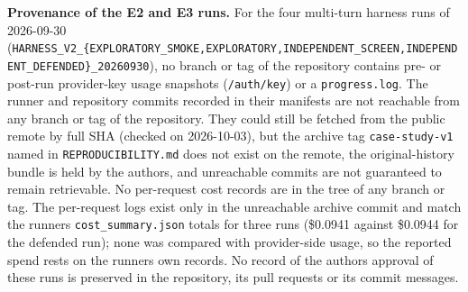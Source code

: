 \documentclass[9pt]{extarticle}
\begin{document}
\textbf{Provenance of the E2 and E3 runs.} For the four multi-turn harness runs of 2026-09-30 (\texttt{HARNESS\_V2\_\{EXPLORATORY\_SMOKE,EXPLORATORY,INDEPENDENT\_SCREEN,INDEPENDENT\_DEFENDED\}\_20260930}), no branch or tag of the repository contains pre- or post-run provider-key usage snapshots (\texttt{/\allowbreak{}auth/\allowbreak{}key}) or a \texttt{progress.log}. The runner and repository commits recorded in their manifests are not reachable from any branch or tag of the repository. They could still be fetched from the public remote by full SHA (checked on 2026-10-03), but the archive tag \texttt{case-study-v1} named in \texttt{REPRODUCIBILITY.md} does not exist on the remote, the original-history bundle is held by the authors, and unreachable commits are not guaranteed to remain retrievable. No per-request cost records are in the tree of any branch or tag. The per-request logs exist only in the unreachable archive commit and match the runner\textquotesingle s \texttt{cost\_\allowbreak{}summary.json} totals for three runs (\$0.0941 against \$0.0944 for the defended run); none was compared with provider-side usage, so the reported spend rests on the runner\textquotesingle s own records. No record of the authors\textquotesingle{} approval of these runs is preserved in the repository, its pull requests or its commit messages.
\end{document}
